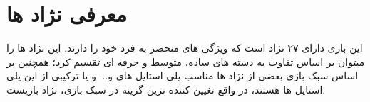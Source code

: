 \chapter{معرفی نژاد ها}
این بازی دارای ۲۷ نژاد است که ویژگی های منحصر به فرد خود را دارند.
این نژاد ها را میتوان بر اساس تفاوت به دسته های ساده، متوسط و حرفه ای تقسیم کرد؛ همچنین بر اساس سبک بازی بعضی از نژاد ها مناسب پلی استایل های  و... و یا ترکیبی از این پلی استایل ها هستند، در واقع تغیین کننده ترین گزینه در سبک بازی، نژاد بازیست.
